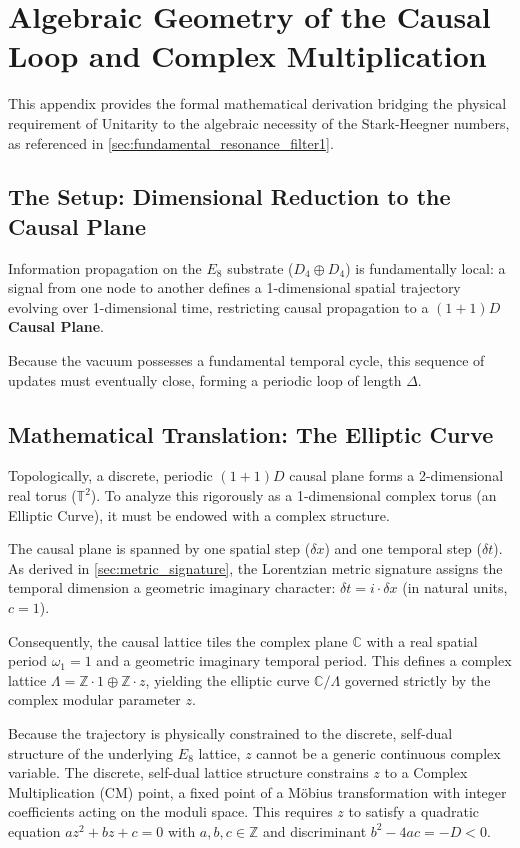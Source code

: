 \section{Algebraic Geometry of the Causal Loop and Complex Multiplication}
\label{app:algebraic_geometry_causal_loop}

This appendix provides the formal mathematical derivation bridging the physical requirement of Unitarity to the algebraic necessity of the Stark-Heegner numbers, as referenced in \cref{sec:fundamental_resonance_filter1}.

\subsection{The Setup: Dimensional Reduction to the Causal Plane}
Information propagation on the $E_8$ substrate ($D_4 \oplus D_4$) is fundamentally local: a signal from one node to another defines a 1-dimensional spatial trajectory evolving over 1-dimensional time, restricting causal propagation to a $(1+1)D$ \textbf{Causal Plane}.

Because the vacuum possesses a fundamental temporal cycle, this sequence of updates must eventually close, forming a periodic loop of length $\Delta$. 

\subsection{Mathematical Translation: The Elliptic Curve}
Topologically, a discrete, periodic $(1+1)D$ causal plane forms a 2-dimensional real torus ($\mathbb{T}^2$). To analyze this rigorously as a 1-dimensional complex torus (an Elliptic Curve), it must be endowed with a complex structure.

The causal plane is spanned by one spatial step ($\delta x$) and one temporal step ($\delta t$). As derived in \cref{sec:metric_signature}, the Lorentzian metric signature assigns the temporal dimension a geometric imaginary character: $\delta t = i \cdot \delta x$ (in natural units, $c=1$). 

Consequently, the causal lattice tiles the complex plane $\mathbb{C}$ with a real spatial period $\omega_1 = 1$ and a geometric imaginary temporal period. This defines a complex lattice $\Lambda = \mathbb{Z} \cdot 1 \oplus \mathbb{Z} \cdot z$, yielding the elliptic curve $\mathbb{C}/\Lambda$ governed strictly by the complex modular parameter $z$.

Because the trajectory is physically constrained to the discrete, self-dual structure of the underlying $E_8$ lattice, $z$ cannot be a generic continuous complex variable. The discrete, self-dual lattice structure constrains $z$ to a Complex Multiplication (CM) point, a fixed point of a M\"obius transformation with integer coefficients acting on the moduli space. This requires $z$ to satisfy a quadratic equation $az^2 + bz + c = 0$ with $a, b, c \in \mathbb{Z}$ and discriminant $b^2 - 4ac = -D < 0$.

